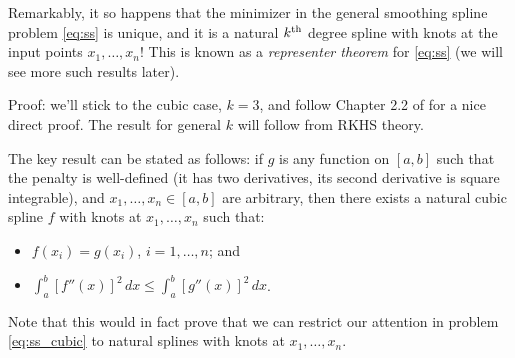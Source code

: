 \documentclass{article}
\begin{document}
Remarkably, it so happens that the minimizer in the general smoothing spline
problem \eqref{eq:ss} is unique, and it is a natural $k^{\text{th}}$ degree spline with 
knots at the input points $x_1,\dots,x_n$! This is known as a \emph{representer
  theorem} for \eqref{eq:ss} (we will see more such results later). 

Proof: we'll stick to the cubic case, $k=3$, and follow Chapter 2.2 of
\citet{green1993nonparametric} for a nice direct proof. The result for general
$k$ will follow from RKHS theory.  

The key result can be stated as follows: if $g$ is any function on $[a,b]$ such
that the penalty is well-defined (it has two derivatives, its second derivative
is square integrable), and $x_1,\dots,x_n \in [a,b]$ are arbitrary, then there
exists a natural cubic spline $f$ with knots at $x_1,\dots,x_n$ such that: 
\begin{itemize}
\item $f(x_i) = g(x_i)$, $i=1,\dots,n$; and 
\item $\int_a^b [f''(x)]^2 \, dx \leq \int_a^b [g''(x)]^2 \, dx$.
\end{itemize}
Note that this would in fact prove that we can restrict our attention in problem 
\eqref{eq:ss_cubic} to natural splines with knots at $x_1,\dots,x_n$.
\end{document}
